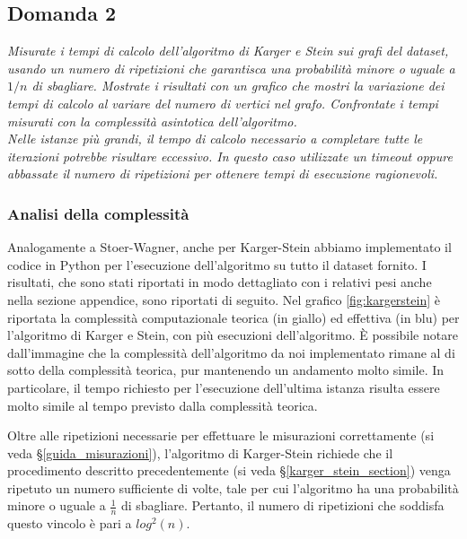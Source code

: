 \subsection{Domanda 2}
\textit{Misurate i tempi di calcolo dell'algoritmo di Karger e Stein sui grafi del dataset, usando un numero di ripetizioni che garantisca una probabilità minore o uguale a $1/n$ di sbagliare. Mostrate i risultati con un grafico che mostri la variazione dei tempi di calcolo al variare del numero di vertici nel grafo. Confrontate i tempi misurati con la complessità asintotica dell'algoritmo. \\
Nelle istanze più grandi, il tempo di calcolo necessario a completare tutte le iterazioni potrebbe risultare eccessivo. In questo caso utilizzate un timeout oppure abbassate il numero di ripetizioni per ottenere tempi di esecuzione ragionevoli.}

\subsubsection{Analisi della complessità}

Analogamente a Stoer-Wagner, anche per Karger-Stein abbiamo 
implementato il codice in Python per l'esecuzione dell'algoritmo su tutto il dataset 
fornito. I risultati, che sono stati riportati in modo dettagliato con i relativi pesi 
anche nella sezione appendice, sono riportati di seguito.
Nel grafico \ref{fig:kargerstein} è riportata la complessità 
computazionale teorica (in giallo) ed effettiva (in blu) per l'algoritmo di Karger e 
Stein, con più esecuzioni dell'algoritmo. È possibile notare dall'immagine che la 
complessità dell'algoritmo da noi implementato rimane al di sotto della complessità 
teorica, pur mantenendo un andamento molto simile. In particolare, il tempo richiesto 
per l'esecuzione dell'ultima istanza risulta essere molto simile al tempo previsto 
dalla complessità teorica.

Oltre alle ripetizioni necessarie per effettuare le misurazioni correttamente 
(si veda \S\ref{guida_misurazioni}), l'algoritmo di Karger-Stein richiede che il 
procedimento descritto precedentemente (si veda \S\ref{karger_stein_section}) venga 
ripetuto un numero sufficiente di volte, tale per cui l'algoritmo ha una probabilità 
minore o uguale a $\frac{1}{n}$ di sbagliare. Pertanto, il numero di ripetizioni che 
soddisfa questo vincolo è pari a $log^{2}(n)$.

